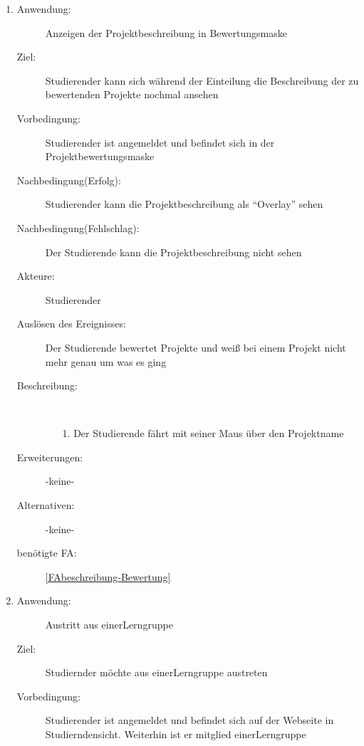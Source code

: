 \documentclass[parskip=full]{scrartcl}
\newcommand{\swtLabel}[1]{\textbf{/#1\arabic*0/}}
\begin{document}
\begin{enumerate}[label=\swtLabel{S}]
  
    \item
  \begin{description}
  \item[Anwendung:] Anzeigen der Projektbeschreibung in Bewertungsmaske
  \item[Ziel:] Studierender kann sich während der Einteilung die Beschreibung
  der zu bewertenden Projekte nochmal ansehen
  	\item[Vorbedingung:] Studierender ist angemeldet und befindet sich in der
  	Projektbewertungsmaske %
  	
  	\item[Nachbedingung(Erfolg):] Studierender kann die Projektbeschreibung als
  	\enquote{Overlay} sehen %
  	
  	\item[Nachbedingung(Fehlschlag):] Der Studierende kann die
  	Projektbeschreibung nicht sehen
  	\item[Akteure:] Studierender
  	\item[Auslösen des Ereignisses:] Der Studierende bewertet Projekte und weiß
  	bei einem Projekt nicht mehr genau um was es ging
  	\item[Beschreibung:]~
  	\begin{enumerate}
  	  \item[1.] Der Studierende fährt mit seiner Maus über den Projektname 
 
  	\end{enumerate}
  	\item[Erweiterungen:] -keine-

  	\item[Alternativen:] -keine-

  	 \item[benötigte FA:] \ref{FAbeschreibung-Bewertung}
  \end{description}
  
      \item
  \begin{description}
  \item[Anwendung:] Austritt aus einer\gls{Lerngruppe}
  \item[Ziel:] Studiernder möchte aus einer\gls{Lerngruppe} austreten
  	\item[Vorbedingung:] Studierender ist angemeldet und befindet sich auf der
  	Webseite in Studierndensicht. Weiterhin ist er mitglied einer\gls{Lerngruppe}
  	

\end{description}
\end{enumerate}
\end{document}
